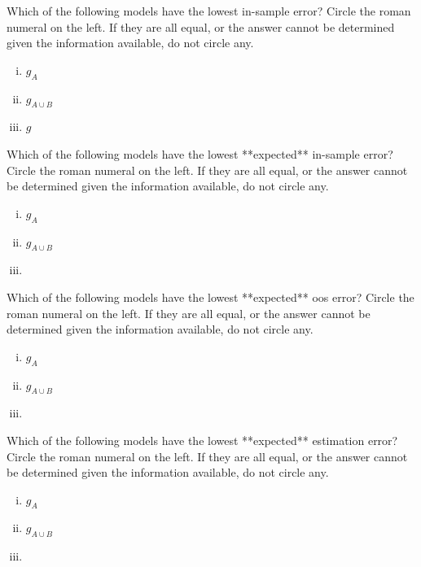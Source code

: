 \documentclass[12pt]{article}
\begin{document}
\begin{enumerate}[(a)]
 Which of the following models have the lowest in-sample error? Circle the roman numeral on the left. If they are all equal, or the answer cannot be determined given the information available, do not circle any.

\begin{enumerate}[(i)]
\item $g_A$
\item $g_{A \cup B}$
\item $g$
\end{enumerate}

 Which of the following models have the lowest **expected** in-sample error? Circle the roman numeral on the left. If they are all equal, or the answer cannot be determined given the information available, do not circle any.

\begin{enumerate}[(i)]
\item $g_A$
\item $g_{A \cup B}$
\item \iftoggle{solutions}{\inred{$g$}}{$g$} 
\end{enumerate}

\vspace{0.5cm}
 Which of the following models have the lowest **expected** oos error? Circle the roman numeral on the left. If they are all equal, or the answer cannot be determined given the information available, do not circle any.

\begin{enumerate}[(i)]
\item $g_A$
\item $g_{A \cup B}$
\item \iftoggle{solutions}{\inred{$g$}}{$g$} 
\end{enumerate}

 Which of the following models have the lowest **expected** estimation error? Circle the roman numeral on the left.  If they are all equal, or the answer cannot be determined given the information available, do not circle any.

\begin{enumerate}[(i)]
\item $g_A$
\item $g_{A \cup B}$
\item \iftoggle{solutions}{\inred{$g$}}{$g$} 
\end{enumerate}


\end{enumerate}
\end{document}
